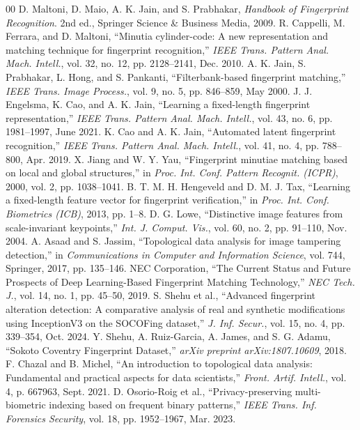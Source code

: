 \documentclass[lettersize,journal]{IEEEtran}
\begin{document}
\begin{thebibliography}{00}
 D. Maltoni, D. Maio, A. K. Jain, and S. Prabhakar, \emph{Handbook of Fingerprint Recognition}. 2nd ed., Springer Science \& Business Media, 2009.
 R. Cappelli, M. Ferrara, and D. Maltoni, ``Minutia cylinder-code: A new representation and matching technique for fingerprint recognition,'' \emph{IEEE Trans. Pattern Anal. Mach. Intell.}, vol. 32, no. 12, pp. 2128--2141, Dec. 2010.
 A. K. Jain, S. Prabhakar, L. Hong, and S. Pankanti, ``Filterbank-based fingerprint matching,'' \emph{IEEE Trans. Image Process.}, vol. 9, no. 5, pp. 846--859, May 2000.
 J. J. Engelsma, K. Cao, and A. K. Jain, ``Learning a fixed-length fingerprint representation,'' \emph{IEEE Trans. Pattern Anal. Mach. Intell.}, vol. 43, no. 6, pp. 1981--1997, June 2021.
 K. Cao and A. K. Jain, ``Automated latent fingerprint recognition,'' \emph{IEEE Trans. Pattern Anal. Mach. Intell.}, vol. 41, no. 4, pp. 788--800, Apr. 2019.
 X. Jiang and W. Y. Yau, ``Fingerprint minutiae matching based on local and global structures,'' in \emph{Proc. Int. Conf. Pattern Recognit. (ICPR)}, 2000, vol. 2, pp. 1038--1041.
 B. T. M. H. Hengeveld and D. M. J. Tax, ``Learning a fixed-length feature vector for fingerprint verification,'' in \emph{Proc. Int. Conf. Biometrics (ICB)}, 2013, pp. 1--8.
 D. G. Lowe, ``Distinctive image features from scale-invariant keypoints,'' \emph{Int. J. Comput. Vis.}, vol. 60, no. 2, pp. 91--110, Nov. 2004.
 A. Asaad and S. Jassim, ``Topological data analysis for image tampering detection,'' in \emph{Communications in Computer and Information Science}, vol. 744, Springer, 2017, pp. 135--146.
 NEC Corporation, ``The Current Status and Future Prospects of Deep Learning-Based Fingerprint Matching Technology,'' \emph{NEC Tech. J.}, vol. 14, no. 1, pp. 45--50, 2019.
 S. Shehu et al., ``Advanced fingerprint alteration detection: A comparative analysis of real and synthetic modifications using InceptionV3 on the SOCOFing dataset,'' \emph{J. Inf. Secur.}, vol. 15, no. 4, pp. 339--354, Oct. 2024.
 Y. Shehu, A. Ruiz-Garcia, A. James, and S. G. Adamu, ``Sokoto Coventry Fingerprint Dataset,'' \emph{arXiv preprint arXiv:1807.10609}, 2018.
 F. Chazal and B. Michel, ``An introduction to topological data analysis: Fundamental and practical aspects for data scientists,'' \emph{Front. Artif. Intell.}, vol. 4, p. 667963, Sept. 2021.
 D. Osorio-Roig et al., ``Privacy-preserving multi-biometric indexing based on frequent binary patterns,'' \emph{IEEE Trans. Inf. Forensics Security}, vol. 18, pp. 1952--1967, Mar. 2023.

\end{thebibliography}
\end{document}
